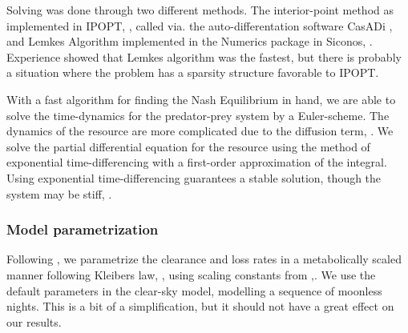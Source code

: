 Solving  was done through two different methods. The interior-point method as implemented in IPOPT, \citep{wachter2006implementation}, called via. the auto-differentation software CasADi \citep{Andersson2019}, and Lemkes Algorithm implemented in the Numerics package in Siconos, \citep{acary2019introduction}. Experience showed that Lemkes algorithm was the fastest, but there is probably a situation where the problem has a sparsity structure favorable to IPOPT.

With a fast algorithm for finding the Nash Equilibrium in hand, we are able to solve the time-dynamics for the predator-prey system by a Euler-scheme. The dynamics of the resource are more complicated due to the diffusion term, . We solve the partial differential equation for the resource using the method of exponential time-differencing with a first-order approximation of the integral. Using exponential time-differencing guarantees a stable solution, though the system may be stiff, \cite{hochbruck2010exponential}. %


\subsubsection*{Model parametrization}
Following \citep{yodzis1991}, we parametrize the clearance and loss rates in a metabolically scaled manner following Kleibers law, \citep{kleiber}, using scaling constants from \citep{kha_2019},. We use the default parameters in the clear-sky model, modelling a sequence of moonless nights. This is a bit of a simplification, but it should not have a great effect on our results.


